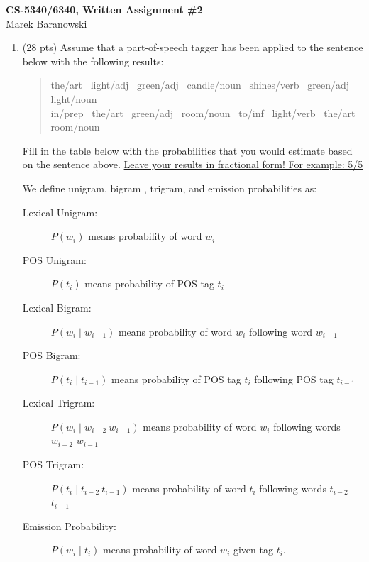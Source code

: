 \documentclass[11pt]{article}
\begin{document}
\large
\begin{center}
{\bf CS-5340/6340, Written Assignment \#2} \\
Marek Baranowski
\end{center}
\normalsize

\begin{enumerate}  

\item (28 pts) Assume that a part-of-speech tagger has been applied to the
sentence below with the following results:

\begin{quote}
the/{\sc art~}  light/{\sc adj~}  green/{\sc adj~} 
  candle/{\sc noun~}  shines/{\sc verb~}  green/{\sc adj~}
 light/{\sc noun~} \\  in/{\sc prep~}  the/{\sc art~} 
  green/{\sc adj~}  room/{\sc noun~}  to/{\sc inf~} 
  light/{\sc verb~}  the/{\sc art~}  room/{\sc noun~}
\end{quote}
\vspace*{.2in}

Fill in the table below with the probabilities that you would estimate
based on the sentence above. \underline{Leave your results in fractional
  form! For example: 5/5}

\vspace*{.1in}
We define unigram, bigram , trigram, and emission probabilities as:
\begin{description}
\item[Lexical Unigram:] $P(w_i)$ means probability of word $w_i$
\item[POS Unigram:] $P(t_i)$ means probability of POS tag $t_i$
\item[Lexical Bigram:] $P(w_i \mid w_{i-1})$ means probability of word
  $w_i$ following word $w_{i-1}$
\item[POS Bigram:] $P(t_i \mid t_{i-1})$ means probability of POS
  tag $t_i$ following POS tag $t_{i-1}$
\item[Lexical Trigram:] $P(w_i \mid w_{i-2}~w_{i-1})$ means probability of word
  $w_i$ following words $w_{i-2}$ $w_{i-1}$
\item[POS Trigram:] $P(t_i \mid t_{i-2}~t_{i-1})$ means probability of word
  $t_i$ following words $t_{i-2}$ $t_{i-1}$
\item[Emission Probability:] $P(w_i \mid t_i)$ means
  probability of word $w_i$ given tag $t_i$.
\end{description}



\end{enumerate}
\end{document}
